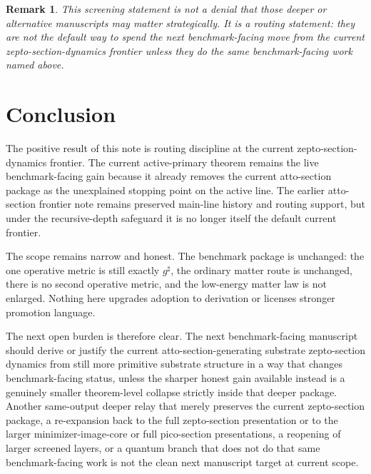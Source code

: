 \documentclass[11pt]{article}
\newcommand{\CompletedMetric}{g^{\sharp}}
\newtheorem{remark}{Remark}
\begin{document}
\begin{remark}
This screening statement is not a denial that those deeper or alternative manuscripts may matter strategically. It is a routing statement: they are not the default way to spend the next benchmark-facing move from the current zepto-section-dynamics frontier unless they do the same benchmark-facing work named above.
\end{remark}

\section{Conclusion}

The positive result of this note is routing discipline at the current zepto-section-dynamics frontier. The current active-primary theorem remains the live benchmark-facing gain because it already removes the current atto-section package as the unexplained stopping point on the active line. The earlier atto-section frontier note remains preserved main-line history and routing support, but under the recursive-depth safeguard it is no longer itself the default current frontier.

The scope remains narrow and honest. The benchmark package is unchanged: the one operative metric is still exactly \(\CompletedMetric\), the ordinary matter route is unchanged, there is no second operative metric, and the low-energy matter law is not enlarged. Nothing here upgrades adoption to derivation or licenses stronger promotion language.

The next open burden is therefore clear. The next benchmark-facing manuscript should derive or justify the current atto-section-generating substrate zepto-section dynamics from still more primitive substrate structure in a way that changes benchmark-facing status, unless the sharper honest gain available instead is a genuinely smaller theorem-level collapse strictly inside that deeper package. Another same-output deeper relay that merely preserves the current zepto-section package, a re-expansion back to the full zepto-section presentation or to the larger minimizer-image-core or full pico-section presentations, a reopening of larger screened layers, or a quantum branch that does not do that same benchmark-facing work is not the clean next manuscript target at current scope.
\end{document}
